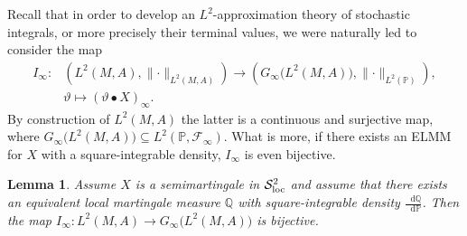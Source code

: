 \documentclass[11pt,a4paper,twoside,openany]{report}
\numberwithin{equation}{section}
\newcommand{\diff}{\mathop{}\!\mathrm{d}}
\theoremstyle{plain} %
\newtheorem{lemma}[theorem]{Lemma}
\theoremstyle{definition} %
\theoremstyle{remark} %
\begin{document}
Recall that in order to develop an \(L^2\)-approximation theory of stochastic integrals, or more precisely their terminal values, we were naturally led to consider the map 
\begin{align*}
I_{\infty}:&(L^2(M,A),\lVert\cdot\rVert_{L^2(M,A)})\to(G_{\infty}\big(L^2(M,A)\big),\lVert\cdot\rVert_{L^2(\mathbb{P})}),
\\&
    \vartheta\mapsto (\vartheta\bullet X)_{\infty}.
\end{align*}
By construction of \(L^2(M,A)\) the latter is a continuous and surjective map,
where \(G_{\infty}\big(L^2(M,A)\big)\subseteq L^2(\mathbb{P},\mathcal{F}_{\infty})\).
What is more, if there exists an ELMM for \(X\) with a square-integrable density, \(I_{\infty}\) is even bijective.
\begin{lemma}\label{lemma:integral map is bijective}
    Assume \(X\) is a semimartingale in \(\mathcal{S}^2_{\rm{loc}}\) and assume that there exists an equivalent local martingale measure \(\mathbb{Q}\) with square-integrable density \(\frac{\diff \mathbb{Q}}{\diff \mathbb{P}}\). Then the map \(I_{\infty}:L^2(M,A)\to G_{\infty}\big(L^2(M,A)\big)\) is bijective.
\end{lemma}
\end{document}
